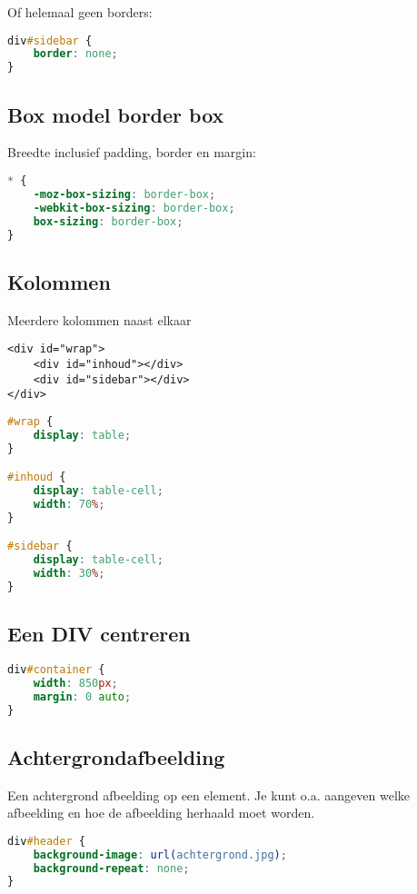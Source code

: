 \documentclass[8pt,pagesize,footinclude=false,headinclude=false]{scrartcl}
\begin{document}
\begin{multicols*}{4}
\noindent Of helemaal geen borders:

\begin{lstlisting}[language=CSS]
div#sidebar {
	border: none;
}
\end{lstlisting}

\subsection*{Box model border box}
Breedte inclusief padding, border en margin:
\begin{lstlisting}[language=CSS]
* { 
	-moz-box-sizing: border-box; 
	-webkit-box-sizing: border-box; 
	box-sizing: border-box;
}
\end{lstlisting}

\subsection*{Kolommen}
Meerdere kolommen naast elkaar
\begin{lstlisting}[language=HTML5]
<div id="wrap">
	<div id="inhoud"></div>
	<div id="sidebar"></div>
</div>
\end{lstlisting}

\begin{lstlisting}[language=CSS]
#wrap {
	display: table;
}

#inhoud {
	display: table-cell;
	width: 70%;
}

#sidebar {
	display: table-cell;
	width: 30%;
}
\end{lstlisting}

\subsection*{Een DIV centreren}
\begin{lstlisting}[language=CSS]
div#container {
	width: 850px;
	margin: 0 auto;
}
\end{lstlisting}

\subsection*{Achtergrondafbeelding}
Een achtergrond afbeelding op een element. Je kunt o.a. aangeven welke afbeelding en hoe de afbeelding herhaald moet worden.
\begin{lstlisting}[language=CSS]
div#header {
	background-image: url(achtergrond.jpg);
	background-repeat: none;
}
\end{lstlisting}


\end{multicols*}
\end{document}
